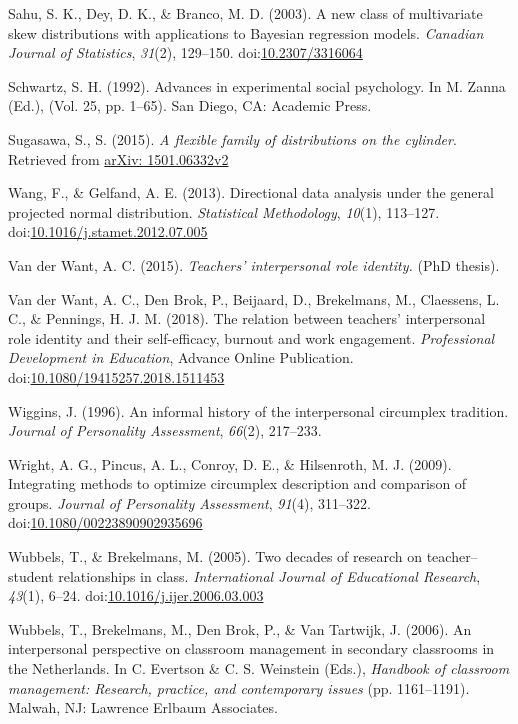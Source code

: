 \documentclass[man,mask]{apa6}
\DeclareRobustCommand{\VANDER}[3]{#2}
\DeclareRobustCommand{\VAN}[3]{#2}
\DeclareRobustCommand{\DEN}[3]{#2}
\begin{document}
\leavevmode\hypertarget{ref-sahu2003new}{}%
Sahu, S. K., Dey, D. K., \& Branco, M. D. (2003). A new class of multivariate skew distributions with applications to Bayesian regression models. \emph{Canadian Journal of Statistics}, \emph{31}(2), 129--150. doi:\href{https://doi.org/10.2307/3316064}{10.2307/3316064}

\leavevmode\hypertarget{ref-schwartz1992values}{}%
Schwartz, S. H. (1992). Advances in experimental social psychology. In M. Zanna (Ed.), (Vol. 25, pp. 1--65). San Diego, CA: Academic Press.

\leavevmode\hypertarget{ref-sugasawa2015flexible}{}%
Sugasawa, S., S. (2015). \emph{A flexible family of distributions on the cylinder}. Retrieved from \href{arXiv:\%201501.06332v2}{arXiv: 1501.06332v2}

\leavevmode\hypertarget{ref-wang2012directional}{}%
Wang, F., \& Gelfand, A. E. (2013). Directional data analysis under the general projected normal distribution. \emph{Statistical Methodology}, \emph{10}(1), 113--127. doi:\href{https://doi.org/10.1016/j.stamet.2012.07.005}{10.1016/j.stamet.2012.07.005}

\leavevmode\hypertarget{ref-vanderWant2015role}{}%
\VANDER{Want}{Van der}{van der} Want, A. C. (2015). \emph{Teachers' interpersonal role identity.} (PhD thesis).

\leavevmode\hypertarget{ref-want2018selfefficacy}{}%
\VANDER{Want}{Van der}{van der} Want, A. C., \DEN{Brok}{Den}{den} Brok, P., Beijaard, D., Brekelmans, M., Claessens, L. C., \& Pennings, H. J. M. (2018). The relation between teachers' interpersonal role identity and their self-efficacy, burnout and work engagement. \emph{Professional Development in Education}, Advance Online Publication. doi:\href{https://doi.org/10.1080/19415257.2018.1511453}{10.1080/19415257.2018.1511453}

\leavevmode\hypertarget{ref-wiggins1996history}{}%
Wiggins, J. (1996). An informal history of the interpersonal circumplex tradition. \emph{Journal of Personality Assessment}, \emph{66}(2), 217--233.

\leavevmode\hypertarget{ref-wright2009integrating}{}%
Wright, A. G., Pincus, A. L., Conroy, D. E., \& Hilsenroth, M. J. (2009). Integrating methods to optimize circumplex description and comparison of groups. \emph{Journal of Personality Assessment}, \emph{91}(4), 311--322. doi:\href{https://doi.org/10.1080/00223890902935696}{10.1080/00223890902935696}

\leavevmode\hypertarget{ref-wubbels2005two}{}%
Wubbels, T., \& Brekelmans, M. (2005). Two decades of research on teacher--student relationships in class. \emph{International Journal of Educational Research}, \emph{43}(1), 6--24. doi:\href{https://doi.org/10.1016/j.ijer.2006.03.003}{10.1016/j.ijer.2006.03.003}

\leavevmode\hypertarget{ref-wubbels2006interpersonal}{}%
Wubbels, T., Brekelmans, M., \DEN{Brok}{Den}{den} Brok, P., \& \VAN{Tartwijk}{Van}{van} Tartwijk, J. (2006). An interpersonal perspective on classroom management in secondary classrooms in the Netherlands. In C. Evertson \& C. S. Weinstein (Eds.), \emph{Handbook of classroom management: Research, practice, and contemporary issues} (pp. 1161--1191). Malwah, NJ: Lawrence Erlbaum Associates.
\end{document}
